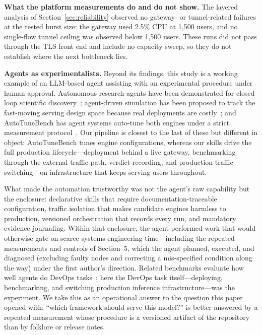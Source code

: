\documentclass[11pt]{article}
\begin{document}
\textbf{What the platform measurements do and do not show.} The layered analysis of Section~\ref{sec:reliability} observed no gateway- or tunnel-related failures at the tested burst size: the gateway used 2.5\% CPU at 1,500 users, and no single-flow tunnel ceiling was observed below 1,500 users. These runs did not pass through the TLS front end and include no capacity sweep, so they do not establish where the next bottleneck lies.

\textbf{Agents as experimentalists.} Beyond its findings, this study is a working example of an LLM-based agent assisting with an experimental procedure under human approval. Autonomous research agents have been demonstrated for closed-loop scientific discovery~\cite{lu2024aiscientist}; agent-driven simulation has been proposed to track the fast-moving serving design space because real deployments are costly~\cite{kim2026simthesizer}; and AutoTuneBench has agent systems auto-tune both engines under a strict measurement protocol~\cite{chen2026autotunebench}. Our pipeline is closest to the last of these but different in object: AutoTuneBench tunes engine configurations, whereas our skills drive the full production lifecycle---deployment behind a live gateway, benchmarking through the external traffic path, verdict recording, and production traffic switching---on infrastructure that keeps serving users throughout.

What made the automation trustworthy was not the agent's raw capability but the enclosure: declarative skills that require documentation-traceable configuration, traffic isolation that makes candidate engines harmless to production, versioned orchestration that records every run, and mandatory evidence journaling. Within that enclosure, the agent performed work that would otherwise gate on scarce systems-engineering time---including the repeated measurements and controls of Section~5, which the agent planned, executed, and diagnosed (excluding faulty nodes and correcting a mis-specified condition along the way) under the first author's direction. Related benchmarks evaluate how well agents do DevOps tasks~\cite{tang2026devopsgym}; here the DevOps task itself---deploying, benchmarking, and switching production inference infrastructure---was the experiment. We take this as an operational answer to the question this paper opened with: ``which framework should serve this model?'' is better answered by a repeated measurement whose procedure is a versioned artifact of the repository than by folklore or release notes.
\end{document}
